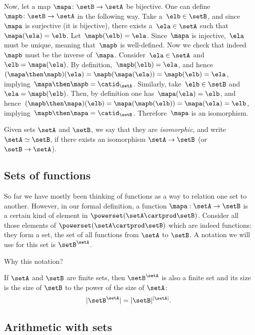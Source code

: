 \begin{solution}
    Now, let a map $\mapa\colon \setB \to \setA$ be bijective.
    One can define~$\mapb\colon \setB\to \setA$ in the following way.
    Take a~$\elb\in \setB$, and since~$\mapa$ is surjective (it is bijective), there exists a~$\ela\in \setA$ such that~$\mapa(\ela)=\elb$.
    Let~$\mapb(\elb)=\ela$.
    Since~$\mapa$ is injective,~$\ela$ must be unique, meaning that~$\mapb$ is well-defined.
    Now we check that indeed~$\mapb$ must be the inverse of~$\mapa$.
    Consider~$\ela \in \setA$ and~$\elb=\mapa(\ela)$.
    By definition,~$\mapb(\elb)=\ela$, and hence~$(\mapa\then \mapb)(\ela)=\mapb(\mapa(\ela))=\mapb(\elb)=\ela$, implying~$\mapa\then \mapb=\catid_\setA$.
    Similarly, take~$\elb\in \setB$ and~$\ela=\mapb(\elb)$.
    Then, by definition one has~$\mapa(\ela)=\elb$, and hence~$(\mapb\then \mapa)(\elb)=\mapa(\mapb(\elb))=\mapa(\ela)=\elb$, implying~$\mapb\then \mapa=\catid_\setB$.
    Therefore~$\mapa$ is an isomorphism.

\end{solution}

Given sets $\setA$ and $\setB$, we say that they are \emph{isomorphic}, and write $\setA \simeq \setB$,
if there exists an isomorphism $\setA \to \setB$ (or $\setB \to \setA$).

\subsection{Sets of functions}

So far we have mostly been thinking of functions as a way to relation one set to another.
However, in our formal definition, a function $\mapa : \setA \to \setB$ is a certain kind of element in $\powerset (\setA \cartprod \setB)$.
Consider all those elements of $\powerset (\setA \cartprod \setB)$ which are indeed functions: they form a set, the set of all functions from $\setA$ to $\setB$.
A notation we will use for this set is $\setB^{\setA}$.

Why this notation?

If $\setA$ and $\setB$ are finite sets, then $\setB^{\setA}$ is also a finite set and its size is the size of $\setB$ to the power of the size of $\setA$:
\begin{equation}
    \vert \setB^{\setA} \vert = \vert \setB \vert^{\vert \setA \vert}.
\end{equation}

\subsection{Arithmetic with sets}

